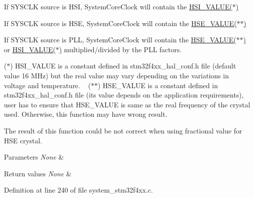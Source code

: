 \begin{DoxyItemize}
\item If S\+Y\+S\+C\+LK source is H\+SI, System\+Core\+Clock will contain the \mbox{\hyperlink{group___s_t_m32_f4xx___system___private___includes_gaaa8c76e274d0f6dd2cefb5d0b17fbc37}{H\+S\+I\+\_\+\+V\+A\+L\+U\+E($\ast$)}}
\item If S\+Y\+S\+C\+LK source is H\+SE, System\+Core\+Clock will contain the \mbox{\hyperlink{group___s_t_m32_f4xx___system___private___includes_gaeafcff4f57440c60e64812dddd13e7cb}{H\+S\+E\+\_\+\+V\+A\+L\+U\+E($\ast$$\ast$)}}
\item If S\+Y\+S\+C\+LK source is P\+LL, System\+Core\+Clock will contain the \mbox{\hyperlink{group___s_t_m32_f4xx___system___private___includes_gaeafcff4f57440c60e64812dddd13e7cb}{H\+S\+E\+\_\+\+V\+A\+L\+U\+E($\ast$$\ast$)}} or \mbox{\hyperlink{group___s_t_m32_f4xx___system___private___includes_gaaa8c76e274d0f6dd2cefb5d0b17fbc37}{H\+S\+I\+\_\+\+V\+A\+L\+U\+E($\ast$)}} multiplied/divided by the P\+LL factors.
\end{DoxyItemize}

($\ast$) H\+S\+I\+\_\+\+V\+A\+L\+UE is a constant defined in stm32f4xx\+\_\+hal\+\_\+conf.\+h file (default value 16 M\+Hz) but the real value may vary depending on the variations in voltage and temperature. ~\newline
 ($\ast$$\ast$) H\+S\+E\+\_\+\+V\+A\+L\+UE is a constant defined in stm32f4xx\+\_\+hal\+\_\+conf.\+h file (its value depends on the application requirements), user has to ensure that H\+S\+E\+\_\+\+V\+A\+L\+UE is same as the real frequency of the crystal used. Otherwise, this function may have wrong result.


\begin{DoxyItemize}
\item The result of this function could be not correct when using fractional value for H\+SE crystal.
\end{DoxyItemize}


\begin{DoxyParams}{Parameters}
{\em None} & \\
\hline
\end{DoxyParams}

\begin{DoxyRetVals}{Return values}
{\em None} & \\
\hline
\end{DoxyRetVals}


Definition at line 240 of file system\+\_\+stm32f4xx.\+c.

